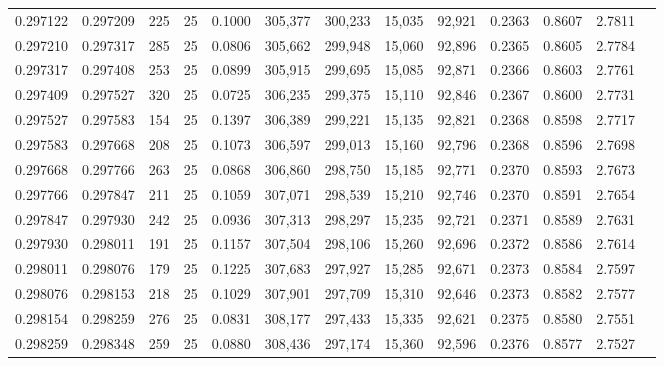 \begin{tabular}{rrrrrrrrrrrrr}
0.297122 & 0.297209 &   225 &  25 &                                     0.1000 & 305,377 & 300,233 &  15,035 &  92,921 & 0.2363 & 0.8607 & 2.7811 \\
0.297210 & 0.297317 &   285 &  25 &                                     0.0806 & 305,662 & 299,948 &  15,060 &  92,896 & 0.2365 & 0.8605 & 2.7784 \\
0.297317 & 0.297408 &   253 &  25 &                                     0.0899 & 305,915 & 299,695 &  15,085 &  92,871 & 0.2366 & 0.8603 & 2.7761 \\
0.297409 & 0.297527 &   320 &  25 &                                     0.0725 & 306,235 & 299,375 &  15,110 &  92,846 & 0.2367 & 0.8600 & 2.7731 \\
0.297527 & 0.297583 &   154 &  25 &                                     0.1397 & 306,389 & 299,221 &  15,135 &  92,821 & 0.2368 & 0.8598 & 2.7717 \\
0.297583 & 0.297668 &   208 &  25 &                                     0.1073 & 306,597 & 299,013 &  15,160 &  92,796 & 0.2368 & 0.8596 & 2.7698 \\
0.297668 & 0.297766 &   263 &  25 &                                     0.0868 & 306,860 & 298,750 &  15,185 &  92,771 & 0.2370 & 0.8593 & 2.7673 \\
0.297766 & 0.297847 &   211 &  25 &                                     0.1059 & 307,071 & 298,539 &  15,210 &  92,746 & 0.2370 & 0.8591 & 2.7654 \\
0.297847 & 0.297930 &   242 &  25 &                                     0.0936 & 307,313 & 298,297 &  15,235 &  92,721 & 0.2371 & 0.8589 & 2.7631 \\
0.297930 & 0.298011 &   191 &  25 &                                     0.1157 & 307,504 & 298,106 &  15,260 &  92,696 & 0.2372 & 0.8586 & 2.7614 \\
0.298011 & 0.298076 &   179 &  25 &                                     0.1225 & 307,683 & 297,927 &  15,285 &  92,671 & 0.2373 & 0.8584 & 2.7597 \\
0.298076 & 0.298153 &   218 &  25 &                                     0.1029 & 307,901 & 297,709 &  15,310 &  92,646 & 0.2373 & 0.8582 & 2.7577 \\
0.298154 & 0.298259 &   276 &  25 &                                     0.0831 & 308,177 & 297,433 &  15,335 &  92,621 & 0.2375 & 0.8580 & 2.7551 \\
0.298259 & 0.298348 &   259 &  25 &                                     0.0880 & 308,436 & 297,174 &  15,360 &  92,596 & 0.2376 & 0.8577 & 2.7527 \\

\end{tabular}
